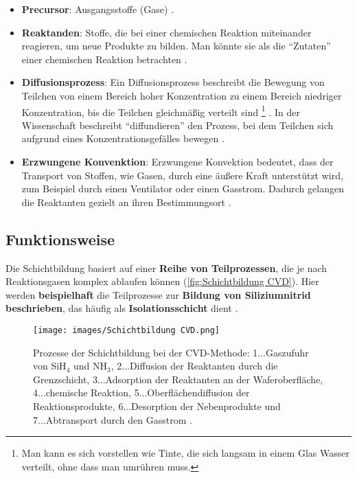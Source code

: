 \documentclass{article} %
\begin{document}
\begin{itemize}
    \item \textbf{Precursor}: Ausgangsstoffe (Gase) \cite{keplinger2024CVD}. 
    \item \textbf{Reaktanden}: Stoffe, die bei einer chemischen Reaktion miteinander reagieren, um neue Produkte zu bilden. Man könnte sie als die ``Zutaten'' 
    einer chemischen Reaktion betrachten \cite{petrucci_general_chemistry, chang_chemistry}.
    \item \textbf{Diffusionsprozess}: Ein Diffusionsprozess beschreibt die Bewegung von Teilchen von einem Bereich hoher Konzentration zu einem Bereich niedriger 
    Konzentration, bis die Teilchen gleichmäßig verteilt sind \footnote{Man kann es sich vorstellen wie Tinte, die sich langsam in einem Glas Wasser verteilt, ohne 
    dass man umrühren muss.} \cite{bergman2011, incropera2007}. In der Wissenschaft beschreibt ``diffundieren'' den Prozess, bei dem Teilchen sich aufgrund eines 
    Konzentrationsgefälles bewegen \cite{crank1975}.
    \item \textbf{Erzwungene Konvenktion}: Erzwungene Konvektion bedeutet, dass der Transport von Stoffen, wie Gasen, durch eine äußere Kraft unterstützt wird, 
    zum Beispiel durch einen Ventilator oder einen Gasstrom. Dadurch gelangen die Reaktanten gezielt an ihren Bestimmungsort \cite{incropera2007, bergman2011, 
    kays2005, bejan2013}.
\end{itemize}

\vspace{1em}
\subsection{Funktionsweise} %
Die Schichtbildung basiert auf einer \textbf{Reihe von Teilprozessen}, die je nach Reaktionsgasen komplex ablaufen können (\autoref{fig:Schichtbildung CVD}). 
Hier werden \textbf{beispielhaft} die Teilprozesse zur \textbf{Bildung von Siliziumnitrid beschrieben}, das häufig als \textbf{Isolationsschicht} dient 
\cite{keplinger2024CVD}.

\begin{figure}[htb!]
    \centering
    \texttt{[image: images/Schichtbildung CVD.png]} %
    \captionsetup{labelfont=bf} %
    \caption{Prozesse der Schichtbildung bei der CVD-Methode: 1...Gaszufuhr von SiH$_4$ und NH$_3$, 2...Diffusion der Reaktanten durch die Grenzschicht, 
    3...Adsorption der Reaktanten an der Waferoberfläche, 4...chemische Reaktion, 5...Oberflächendiffusion der Reaktionsprodukte, 6...Desorption der Nebenprodukte 
    und 7...Abtransport durch den Gasstrom \cite{keplinger2024CVD}.}
    \label{fig:Schichtbildung CVD}
\end{figure}
\end{document}
